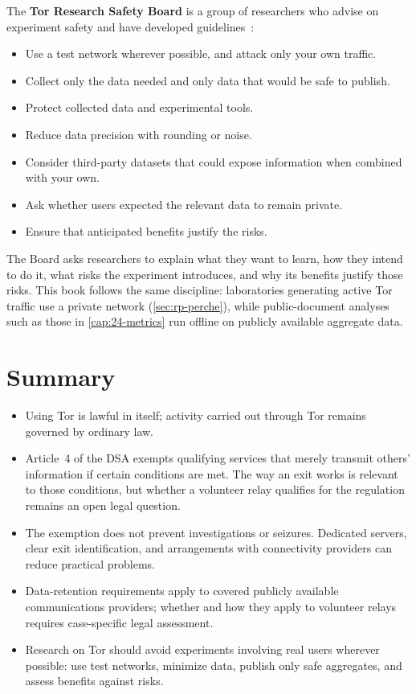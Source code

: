 The \textbf{Tor Research Safety Board} is a group of researchers who advise on experiment safety and have developed guidelines~\cite{trsb}:
\begin{itemize}
  \item Use a test network wherever possible, and attack only your own traffic.
  \item Collect only the data needed and only data that would be safe to publish.
  \item Protect collected data and experimental tools.
  \item Reduce data precision with rounding or noise.
  \item Consider third-party datasets that could expose information when combined with your own.
  \item Ask whether users expected the relevant data to remain private.
  \item Ensure that anticipated benefits justify the risks.
\end{itemize}
The Board asks researchers to explain what they want to learn, how they intend to do it, what risks the experiment introduces, and why its benefits justify those risks. This book follows the same discipline: laboratories generating active Tor traffic use a private network (\cref{sec:rp-perche}), while public-document analyses such as those in \cref{cap:24-metrics} run offline on publicly available aggregate data.

\section*{Summary}
\begin{itemize}
  \item Using Tor is lawful in itself; activity carried out through Tor remains governed by ordinary law.
  \item Article~4 of the DSA exempts qualifying services that merely transmit others' information if certain conditions are met. The way an exit works is relevant to those conditions, but whether a volunteer relay qualifies for the regulation remains an open legal question.
  \item The exemption does not prevent investigations or seizures. Dedicated servers, clear exit identification, and arrangements with connectivity providers can reduce practical problems.
  \item Data-retention requirements apply to covered publicly available communications providers; whether and how they apply to volunteer relays requires case-specific legal assessment.
  \item Research on Tor should avoid experiments involving real users wherever possible: use test networks, minimize data, publish only safe aggregates, and assess benefits against risks.
\end{itemize}

